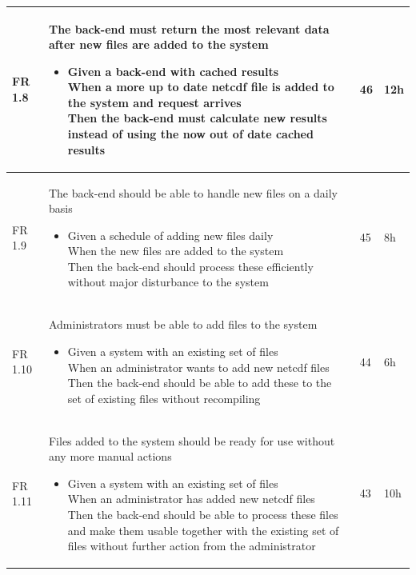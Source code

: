 \documentclass[11pt,a4paper,titlepage,oneside]{report}
\begin{document}
\begin{longtable}{p{1.4cm} p{7.8cm} p{1cm} p{1cm} }
  FR 1.8 & The back-end must return the most relevant data after new files are added to the system
  \begin{itemize}
  \item \parbox[t]{6.8cm}{
        Given a back-end with cached results \\
        When a more up to date \gls{netcdf} file is added to the system and request arrives \\
        Then the back-end must calculate new results instead of using the now out of date cached results}
  \end{itemize}
  & 46 & 12h \\ \hline

  FR 1.9 & The back-end should be able to handle new files on a daily basis
  \begin{itemize}
  \item \parbox[t]{6.8cm}{
        Given a schedule of adding new files daily \\
        When the new files are added to the system \\
        Then the back-end should process these efficiently without major disturbance to the system}
  \end{itemize}
  & 45 & 8h \\ \hline

  FR 1.10 & Administrators must be able to add files to the system
  \begin{itemize}
  \item \parbox[t]{6.8cm}{
        Given a system with an existing set of files \\
        When an administrator wants to add new \gls{netcdf} files \\
        Then the back-end should be able to add these to the set of existing files without recompiling}
  \end{itemize}
  & 44 & 6h \\ \hline

  FR 1.11 & Files added to the system should be ready for use without any more manual actions
  \begin{itemize}
  \item \parbox[t]{6.8cm}{
        Given a system with an existing set of files \\
        When an administrator has added new \gls{netcdf} files \\
        Then the back-end should be able to process these files and make them usable together with the existing set of files without further action from the administrator}
  \end{itemize}
  & 43 & 10h \\ \hline


\end{longtable}
\end{document}
